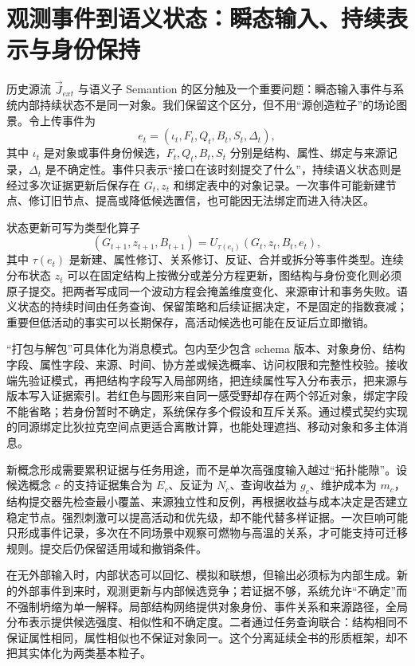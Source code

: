 \section{观测事件到语义状态：瞬态输入、持续表示与身份保持}
\label{sec:section_873}

历史源流 $\vec J_{ext}$ 与语义子 Semantion 的区分触及一个重要问题：瞬态输入事件与系统内部持续状态不是同一对象。我们保留这个区分，但不用“源创造粒子”的场论图景。令上传事件为
\[
e_t=(\iota_t,F_t,Q_t,B_t,S_t,\Delta_t),
\]
其中 $\iota_t$ 是对象或事件身份候选，$F_t,Q_t,B_t,S_t$ 分别是结构、属性、绑定与来源记录，$\Delta_t$ 是不确定性。事件只表示“接口在该时刻提交了什么”，持续语义状态则是经过多次证据更新后保存在 $G_t,z_t$ 和绑定表中的对象记录。一次事件可能新建节点、修订旧节点、提高或降低候选置信，也可能因无法绑定而进入待决区。

状态更新可写为类型化算子
\[
(G_{t+1},z_{t+1},B_{t+1})=U_{\tau(e_t)}(G_t,z_t,B_t,e_t),
\]
其中 $\tau(e_t)$ 是新建、属性修订、关系修订、反证、合并或拆分等事件类型。连续分布状态 $z_t$ 可以在固定结构上按微分或差分方程更新，图结构与身份变化则必须原子提交。把两者写成同一个波动方程会掩盖维度变化、来源审计和事务失败。语义状态的持续时间由任务查询、保留策略和后续证据决定，不是固定的指数衰减；重要但低活动的事实可以长期保存，高活动候选也可能在反证后立即撤销。

“打包与解包”可具体化为消息模式。包内至少包含 schema 版本、对象身份、结构字段、属性字段、来源、时间、协方差或候选概率、访问权限和完整性校验。接收端先验证模式，再把结构字段写入局部网络，把连续属性写入分布表示，把来源与版本写入证据索引。若红色与圆形来自同一感受野却存在两个邻近对象，绑定字段不能省略；若身份暂时不确定，系统保存多个假设和互斥关系。通过模式契约实现的同源绑定比狄拉克空间点更适合离散计算，也能处理遮挡、移动对象和多主体消息。

新概念形成需要累积证据与任务用途，而不是单次高强度输入越过“拓扑能隙”。设候选概念 $c$ 的支持证据集合为 $E_c$、反证为 $N_c$、查询收益为 $g_c$、维护成本为 $m_c$，结构提交器先检查最小覆盖、来源独立性和反例，再根据收益与成本决定是否建立稳定节点。强烈刺激可以提高活动和优先级，却不能代替多样证据。一次巨响可能只形成事件记录，多次在不同场景中观察可燃物与高温的关系，才可能支持可迁移规则。提交后仍保留适用域和撤销条件。

在无外部输入时，内部状态可以回忆、模拟和联想，但输出必须标为内部生成。新的外部事件到来时，观测更新与内部候选竞争；若证据不够，系统允许“不确定”而不强制坍缩为单一解释。局部结构网络提供对象身份、事件关系和来源路径，全局分布表示提供候选强度、相似性和不确定度。二者通过任务查询联合：结构相同不保证属性相同，属性相似也不保证对象同一。这个分离延续全书的形质框架，却不把其实体化为两类基本粒子。

